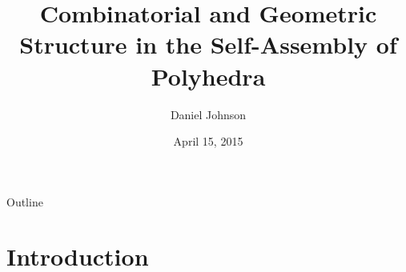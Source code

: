 \documentclass{beamer}
\title{Combinatorial and Geometric Structure in the Self-Assembly of Polyhedra}
\author{Daniel Johnson}
\date{April 15, 2015}
\begin{document}

\frame{\titlepage}

\section[Outline]{}
\begin{frame}{Outline}
  \tableofcontents
\end{frame}
\section{Introduction}
\end{document}
